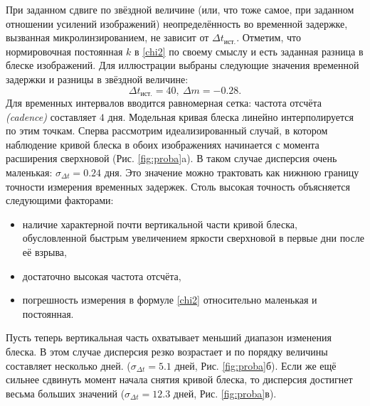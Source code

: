 При заданном сдвиге по звёздной величине (или, что тоже самое, при заданном отношении усилений изображений) неопределённость во временной задержке, вызванная микролинзированием, не зависит от $\Delta t_{\textrm{ист.}}$. Отметим, что нормировочная постоянная $k$ в \eqref{chi2} по своему смыслу и есть заданная разница в блеске изображений.
Для иллюстрации выбраны следующие значения временной задержки и разницы в звёздной величине: $$\Delta t_{\textrm{ист.}}=40, \ \Delta m = -0.28.$$
Для временных интервалов вводится равномерная сетка: частота отсчёта \textit{(cadence)} составляет $4$ дня. Модельная кривая блеска линейно интерполируется по этим точкам.
Сперва рассмотрим идеализированный случай, в котором наблюдение кривой блеска в обоих изображениях начинается с момента расширения сверхновой (Рис. \ref{fig:proba}a). В таком случае дисперсия очень маленькая: $\sigma_{\Delta t}=0.24$ дня. Это значение можно трактовать как нижнюю границу точности измерения временных задержек. Столь высокая точность объясняется следующими факторами: 

\begin{itemize}
    \item наличие характерной почти вертикальной части кривой блеска, обусловленной быстрым увеличением яркости сверхновой в первые дни после её взрыва,
    \item достаточно высокая частота отсчёта,
    \item погрешность измерения в формуле \eqref{chi2} относительно маленькая и постоянная.
\end{itemize}
Пусть теперь вертикальная часть охватывает меньший диапазон изменения блеска. В этом случае дисперсия резко возрастает и по порядку величины составляет несколько дней. ($\sigma_{\Delta t}=5.1$ дней, Рис. \ref{fig:proba}б). Если же ещё сильнее сдвинуть момент начала снятия кривой блеска, то дисперсия достигнет весьма больших значений ($\sigma_{\Delta t}=12.3$ дней, Рис. \ref{fig:proba}в). 


